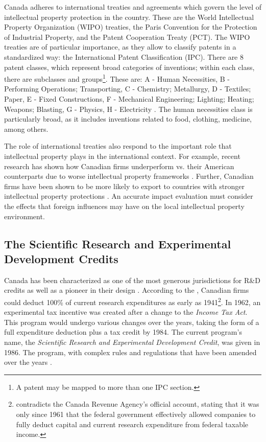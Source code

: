 \documentclass[../main.tex]{subfiles}
\begin{document}

Canada adheres to international treaties and agreements which govern the level of intellectual property protection in the country. These are the World Intellectual Property Organization (WIPO) treaties, the Paris Convention for the Protection of Industrial Property, and the Patent Cooperation Treaty (PCT). The WIPO treaties are of particular importance, as they allow to classify patents in a standardized way: the International Patent Classification (IPC). There are 8 patent classes, which represent broad categories of inventions; within each class, there are subclasses and groups\footnote{A patent may be mapped to more than one IPC section.}. These are: A - Human Necessities, B - Performing Operations; Transporting, C - Chemistry; Metallurgy, D - Textiles; Paper, E - Fixed Constructions, F - Mechanical Engineering; Lighting; Heating; Weapons; Blasting, G - Physics, H - Electricity \parencite{worldintellectualpropertyorganization24}. The human necessities class is particularly broad, as it includes inventions related to food, clothing, medicine, among others. 
 
The role of international treaties also respond to the important role that intellectual property plays in the international context. For example, recent research has shown how Canadian firms underperform vs. their American counterparts due to worse intellectual property frameworks \parencite{carew_etal06}. Further, Canadian firms have been shown to be more likely to export to countries with stronger intellectual property protections \parencite{rafiquzzaman02}. An accurate impact evaluation must consider the effects that foreign influences may have on the local intellectual property environment.

\subsection{The Scientific Research and Experimental Development Credits}

Canada has been characterized as one of the most generous jurisdictions for R\&D credits \parencite{mckenzie08} as well as a pioneer in their design \parencite{mansfield_switzer85a}. According to the \textcite{canadarevenueagency23}, Canadian firms could deduct 100\% of current research expenditures as early as 1941\footnote{\textcite{mansfield_switzer85a} contradicts the Canada Revenue Agency's official account, stating that it was only since 1961 that the federal government effectively allowed companies to fully deduct capital and current research expenditure from federal taxable income.}. In 1962, an experimental tax incentive was created after a change to the \textit{Income Tax Act}. This program would undergo various changes over the years, taking the form of a full expenditure deduction plus a tax credit by 1984. The current program's name, the \textit{Scientific Research and Experimental Development Credit}, was given in 1986. The program, with complex rules and regulations that have been amended over the years \parencite{canadarevenueagency15}.
\end{document}
